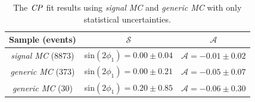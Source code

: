 \begin{table}
	\centering
	\caption{The $\it{CP}$ fit results using \textit{signal MC} and \textit{generic MC} with only statistical uncertainties.}
	\label{tab:cpfit_result_mc}
\begin{tabular}{|c|c|c|}
	\hline
	Sample (events)& $\mathcal{S}$ &  $\mathcal{A}$\\
	\hline
	\textit{signal MC} (8873) & sin$(2\phi_1) = 0.00 \pm 0.04 $ &  $\mathcal{A} = -0.01 \pm 0.02$\\
	\hline
	\textit{generic MC} (373) &  sin$(2\phi_1)  = 0.00 \pm 0.21$ & $\mathcal{A}  = -0.05 \pm 0.07$ \\
	\hline
	\textit{generic MC} (30) & sin$(2\phi_1) = 0.20 \pm 0.85 $& $\mathcal{A} = -0.06 \pm 0.30$ \\
	\hline
\end{tabular}
\end{table}

